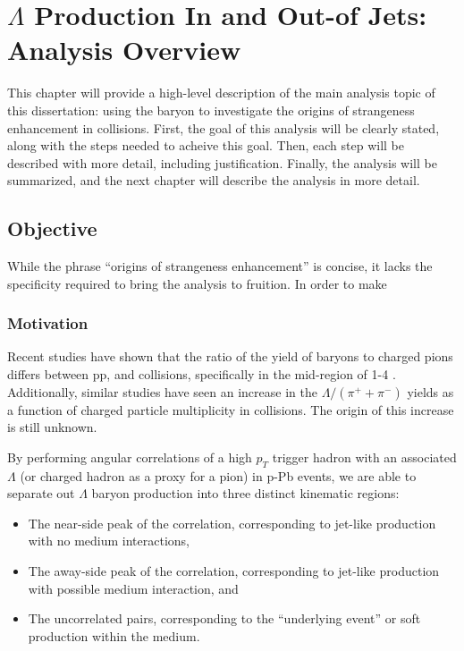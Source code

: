 \chapter{$\Lambda$ Production In and Out-of Jets: Analysis Overview}

This chapter will provide a high-level description of the main analysis topic of this dissertation: using the \lmb baryon to investigate the origins of strangeness enhancement in \pPb collisions. First, the goal of this analysis will be clearly stated, along with the steps needed to acheive this goal. Then, each step will be described with more detail, including justification. Finally, the analysis will be summarized, and the next chapter will describe the analysis in more detail.

\section{Objective}
While the phrase ``origins of strangeness enhancement'' is concise, it lacks the specificity required to bring the analysis to fruition. In order to make 


\subsection{Motivation}
\label{motivation}
Recent studies have shown that the ratio of the yield of \lmb baryons to charged pions differs between pp, \pPb and \PbPb collisions, specifically in the mid-\pt region of 1-4 \GeVc.  Additionally, similar studies have seen an increase in the $\Lambda/(\pi^{+} + \pi^{-})$ yields as a function of charged particle multiplicity in \pPb collisions. The origin of this increase is still unknown.

By performing angular correlations of a high $p_T$ trigger hadron with an associated $\Lambda$ (or charged hadron as a proxy for a pion) in p-Pb events, we are able to separate out $\Lambda$ baryon production into three distinct kinematic regions:
\begin{itemize}
\item The near-side peak of the correlation, corresponding to jet-like production with no medium interactions,
\item The away-side peak of the correlation, corresponding to jet-like production with possible medium interaction, and
\item The uncorrelated pairs, corresponding to the ``underlying event'' or soft production within the medium.
\end{itemize}

